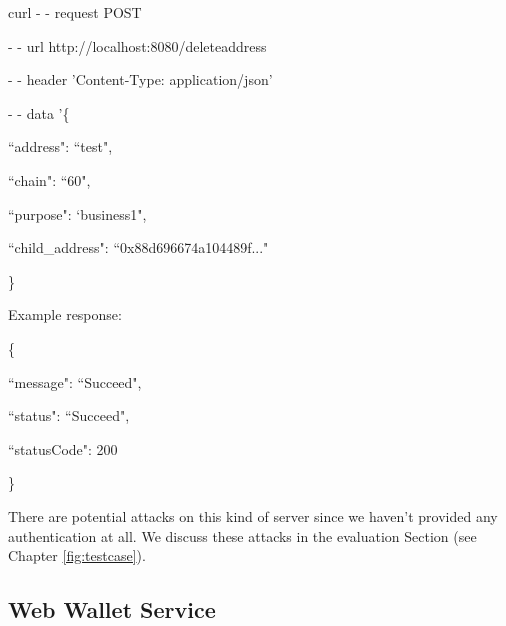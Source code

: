 \begin{framed}
\hspace*{13mm}    curl - - request POST \par
\hspace*{13mm}        - - url http://localhost:8080/deleteaddress \par
\hspace*{13mm}        - - header 'Content-Type: application/json' \par
\hspace*{13mm}        - - data '\{ \par
\hspace*{27mm}                ``address": ``test",  \par
\hspace*{40mm}                ``chain": ``60", \par
\hspace*{40mm}                ``purpose": `business1", \par
\hspace*{40mm}                ``child\_address": ``0x88d696674a104489f..." \par
\hspace*{27mm}              \} \par
\end{framed}

Example response:

\begin{framed}
    \hspace*{13mm}        \{ \par
    \hspace*{13mm}                ``message": ``Succeed",    \par
    \hspace*{13mm}                ``status": ``Succeed",    \par
    \hspace*{13mm}             ``statusCode": 200    \par
    \hspace*{13mm}                 \}    \par
\end{framed}

There are potential attacks on this kind of server since we haven’t provided any authentication at all. We discuss these attacks in the evaluation Section (see Chapter \ref{fig:testcase}).

\subsection{Web Wallet Service}
\label{webui}

